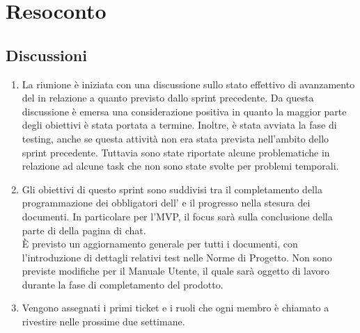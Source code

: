 \section{Resoconto} \label{sec:resoconto}
\subsection{Discussioni} \label{subsec:resdiscussione}
\begin{enumerate}
    \item La riunione è iniziata con una discussione sullo stato effettivo di avanzamento del  in relazione a quanto previsto dallo sprint precedente. Da questa discussione è emersa una considerazione positiva in quanto la maggior parte degli obiettivi è stata portata a termine. Inoltre, è stata avviata la fase di testing, anche se questa attività non era stata prevista nell'ambito dello sprint precedente.
    Tuttavia sono state riportate alcune problematiche in relazione ad alcune task che non sono state svolte per problemi temporali.

    \item Gli obiettivi di questo sprint sono suddivisi tra il completamento della programmazione dei  obbligatori dell' e il progresso nella stesura dei documenti. In particolare per l'MVP, il focus sarà sulla conclusione della parte di  della pagina di chat.\\
    È previsto un aggiornamento generale per tutti i documenti, con l'introduzione di dettagli relativi  test nelle Norme di Progetto. Non sono previste modifiche per il Manuale Utente, il quale sarà oggetto di lavoro durante la fase di completamento del prodotto.
    \item Vengono assegnati i primi ticket e i ruoli che ogni membro è chiamato a rivestire nelle prossime due settimane.
\end{enumerate}

